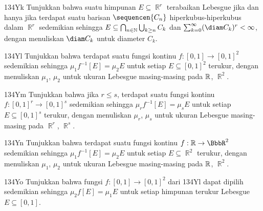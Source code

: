 {\spheader 134Yk Tunjukkan bahwa suatu himpunan $E\subseteq\BbbR^r$
terabaikan Lebesgue jika dan hanya jika terdapat suatu barisan
$\sequencen{C_n}$ hiperkubus-hiperkubus dalam $\BbbR^r$ sedemikian sehingga
$E\subseteq\bigcap_{n\in\Bbb N}\bigcup_{k\ge n}C_k$ dan
$\sum_{k=0}^{\infty}(\diam C_k)^r<\infty$, dengan menuliskan $\diam C_k$
untuk diameter $C_k$.

\spheader 134Yl Tunjukkan bahwa terdapat suatu fungsi kontinu
$f:[0,1]\to[0,1]^2$ sedemikian sehingga $\mu_1f^{-1}[E]=\mu_2E$ untuk
setiap $E\subseteq[0,1]^2$ terukur, dengan menuliskan $\mu_1$, $\mu_2$
untuk ukuran Lebesgue masing-masing pada $\Bbb R$, $\BbbR^2$. 

\spheader 134Ym Tunjukkan bahwa jika $r\le s$, terdapat suatu fungsi kontinu
$f:[0,1]^r\to[0,1]^s$ sedemikian sehingga $\mu_rf^{-1}[E]=\mu_sE$ untuk
setiap $E\subseteq[0,1]^s$ terukur, dengan menuliskan $\mu_r$, $\mu_s$
untuk ukuran Lebesgue masing-masing pada $\BbbR^r$, $\BbbR^s$.

\spheader 134Yn Tunjukkan bahwa terdapat suatu fungsi kontinu
$f:\Bbb R\to\BbbR^2$ sedemikian sehingga $\mu_1f^{-1}[E]=\mu_2E$ untuk
setiap $E\subseteq\BbbR^2$ terukur, dengan menuliskan $\mu_1$, $\mu_2$
untuk ukuran Lebesgue masing-masing pada $\Bbb R$, $\BbbR^2$.

\spheader 134Yo Tunjukkan bahwa fungsi $f:[0,1]\to[0,1]^2$ dari 134Yl dapat
dipilih sedemikian sehingga $\mu_2f[E]=\mu_1E$ untuk setiap himpunan terukur
Lebesgue $E\subseteq[0,1]$. 

}
